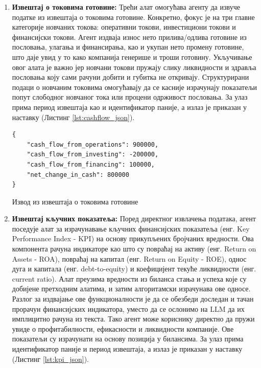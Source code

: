 \begin{enumerate}
    \item \textbf{Извештај о токовима готовине:} Трећи алат омогућава агенту да извуче податке из извештаја о токовима готовине. Конкретно, фокус је на три главне категорије новчаних токова: оперативни токови, инвестициони токови и финансијски токови. Агент издваја износ нето прилива/одлива готовине из пословања, улагања и финансирања, као и укупан нето промену готовине, што даје увид у то како компанија генерише и троши готовину. Укључивање овог алата је важно јер новчани токови пружају слику ликвидности и здравља пословања коју сами рачуни добити и губитка не откривају. Структурирани подаци о новчаним токовима омогућавају да се касније израчунају показатељи попут слободног новчаног тока или процени одрживост пословања. За улаз прима период извештаја као и идентификатор паније, а излаз је приказан у наставку (Листинг \ref{lst:cashflow_json}).

    \begin{center}
    \begin{listing}[!ht]
    \begin{verbatim}
{
    "cash_flow_from_operations": 900000,
    "cash_flow_from_investing": -200000,
    "cash_flow_from_financing": 100000,
    "net_change_in_cash": 800000
}
    \end{verbatim}
    \caption{Извод из извештаја о токовима готовине}\label{lst:cashflow_json}
    \end{listing}
    \end{center}

    \item \textbf{Извештај кључних показатеља:} Поред директног извлачења података, агент поседује алат за израчунавање кључних финансијских показатеља (енг. Key Performance Index - KPI) на основу прикупљених бројчаних вредности. Ова компонента рачуна индикаторе као што су повраћај на активу (енг. Return on Assets - ROA), повраћај на капитал (енг. Return on Equity - ROE), однос дуга и капитала (енг. debt-to-equity) и коефицијент текуће ликвидности (енг. current ratio). Алат преузима вредности из биланса стања и успеха које су добијене претходним алатима, и затим алгоритамски израчунава ове односе. Разлог за издвајање ове функционалности је да се обезбеди доследан и тачан прорачун финансијских индикатора, уместо да се ослонимо на LLM да их имплицитно рачуна из текста. Тако агент може кориснику директно да пружи увиде о профитабилности, ефикасности и ликвидности компаније. Ове показатељи су израчунати на основу позиција у билансима. За улаз прима идентификатор паније и период извештаја, а излаз је приказан у наставку (Листинг \ref{lst:kpi_json}).


\end{enumerate}
